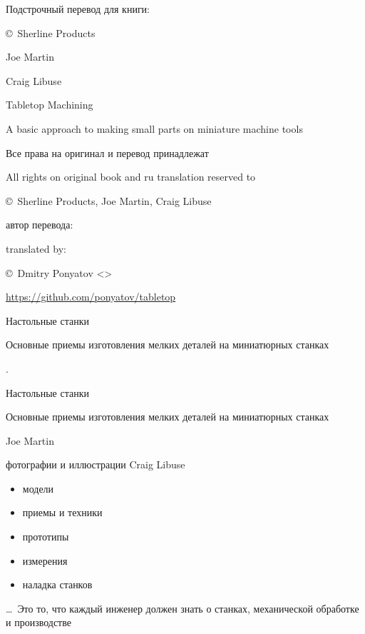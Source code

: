 \begin{titlepage}

Подстрочный перевод для книги:
\bigskip

{\Large \copyright\ Sherline Products}

{\Large Joe Martin}

{\Large Craig Libuse}

\begin{centering}

\bigskip
{\Huge Tabletop Machining}

\bigskip
{\Large A basic approach to making small parts on miniature machine tools}

\end{centering}

\bigskip
Все права на оригинал и перевод принадлежат

All rights on original book and ru translation reserved to

\copyright\ Sherline Products, Joe Martin, Craig Libuse

\bigskip
автор перевода:

translated by:

\copyright\ Dmitry Ponyatov <>

\bigskip
\url{https://github.com/ponyatov/tabletop}

\bigskip
\begin{centering}

\bigskip
{\Huge Настольные станки}

\bigskip
{\Large Основные приемы изготовления мелких деталей на миниатюрных станках}

\end{centering}

\end{titlepage}

\begin{titlepage}

.
\vspace{1cm}

\begin{centering}

\bigskip
{\Huge Настольные станки}

\bigskip
{\Large Основные приемы изготовления мелких деталей на миниатюрных станках}

\end{centering}

{\Large
\bigskip
Joe Martin

\bigskip
фотографии и иллюстрации Craig Libuse
}

\bigskip
\begin{itemize}
  \item модели
  \item приемы и техники
  \item прототипы
  \item измерения
  \item наладка станков
\end{itemize}

\bigskip
\ldots\ Это то, что каждый инженер должен знать о станках, механической
обработке и производстве

\end{titlepage}
